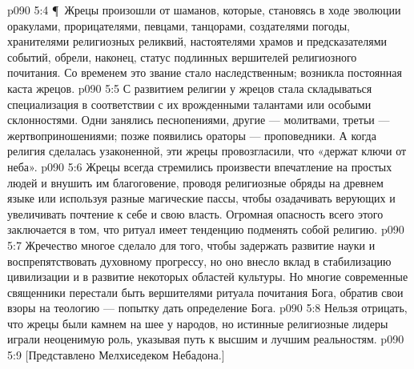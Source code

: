 \vs p090 5:4 \P\ Жрецы произошли от шаманов, которые, становясь в ходе эволюции оракулами, прорицателями, певцами, танцорами, создателями погоды, хранителями религиозных реликвий, настоятелями храмов и предсказателями событий, обрели, наконец, статус подлинных вершителей религиозного почитания. Со временем это звание стало наследственным; возникла постоянная каста жрецов.
\vs p090 5:5 С развитием религии у жрецов стала складываться специализация в соответствии с их врожденными талантами или особыми склонностями. Одни занялись песнопениями, другие --- молитвами, третьи --- жертвоприношениями; позже появились ораторы --- проповедники. А когда религия сделалась узаконенной, эти жрецы провозгласили, что «держат ключи от неба».
\vs p090 5:6 Жрецы всегда стремились произвести впечатление на простых людей и внушить им благоговение, проводя религиозные обряды на древнем языке или используя разные магические пассы, чтобы озадачивать верующих и увеличивать почтение к себе и свою власть. Огромная опасность всего этого заключается в том, что ритуал имеет тенденцию подменять собой религию.
\vs p090 5:7 Жречество многое сделало для того, чтобы задержать развитие науки и воспрепятствовать духовному прогрессу, но оно внесло вклад в стабилизацию цивилизации и в развитие некоторых областей культуры. Но многие современные священники перестали быть вершителями ритуала почитания Бога, обратив свои взоры на теологию --- попытку дать определение Бога.
\vs p090 5:8 Нельзя отрицать, что жрецы были камнем на шее у народов, но истинные религиозные лидеры играли неоценимую роль, указывая путь к высшим и лучшим реальностям.
\vs p090 5:9 [Представлено Мелхиседеком Небадона.]

